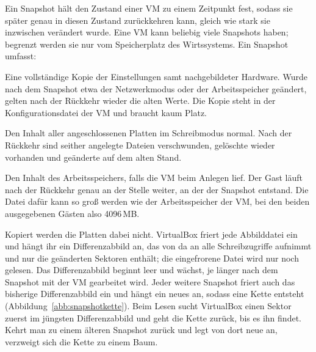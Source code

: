 Ein Snapshot hält den Zustand einer VM zu einem Zeitpunkt fest, sodass sie später genau in diesen Zustand zurückkehren kann, gleich wie stark sie inzwischen verändert wurde. Eine VM kann beliebig viele Snapshots haben; begrenzt werden sie nur vom Speicherplatz des Wirtssystems. Ein Snapshot umfasst:

\begin{description}[nosep]
  \item[Einstellungen] Eine vollständige Kopie der Einstellungen samt nachgebildeter Hardware. Wurde nach dem Snapshot etwa der Netzwerkmodus oder der Arbeitsspeicher geändert, gelten nach der Rückkehr wieder die alten Werte. Die Kopie steht in der Konfigurationsdatei der VM und braucht kaum Platz.
  \item[Virtuelle Festplatten] Den Inhalt aller angeschlossenen Platten im Schreibmodus normal. Nach der Rückkehr sind seither angelegte Dateien verschwunden, gelöschte wieder vorhanden und geänderte auf dem alten Stand.
  \item[Arbeitsspeicher] Den Inhalt des Arbeitsspeichers, falls die VM beim Anlegen lief. Der Gast läuft nach der Rückkehr genau an der Stelle weiter, an der der Snapshot entstand. Die Datei dafür kann so groß werden wie der Arbeitsspeicher der VM, bei den beiden ausgegebenen Gästen also 4096\,MB.
\end{description}

Kopiert werden die Platten dabei nicht. VirtualBox friert jede Abbilddatei ein und hängt ihr ein Differenzabbild an, das von da an alle Schreibzugriffe aufnimmt und nur die geänderten Sektoren enthält; die eingefrorene Datei wird nur noch gelesen. Das Differenzabbild beginnt leer und wächst, je länger nach dem Snapshot mit der VM gearbeitet wird. Jeder weitere Snapshot friert auch das bisherige Differenzabbild ein und hängt ein neues an, sodass eine Kette entsteht (Abbildung~\ref{abb:snapshotkette}). Beim Lesen sucht VirtualBox einen Sektor zuerst im jüngsten Differenzabbild und geht die Kette zurück, bis es ihn findet. Kehrt man zu einem älteren Snapshot zurück und legt von dort neue an, verzweigt sich die Kette zu einem Baum.

